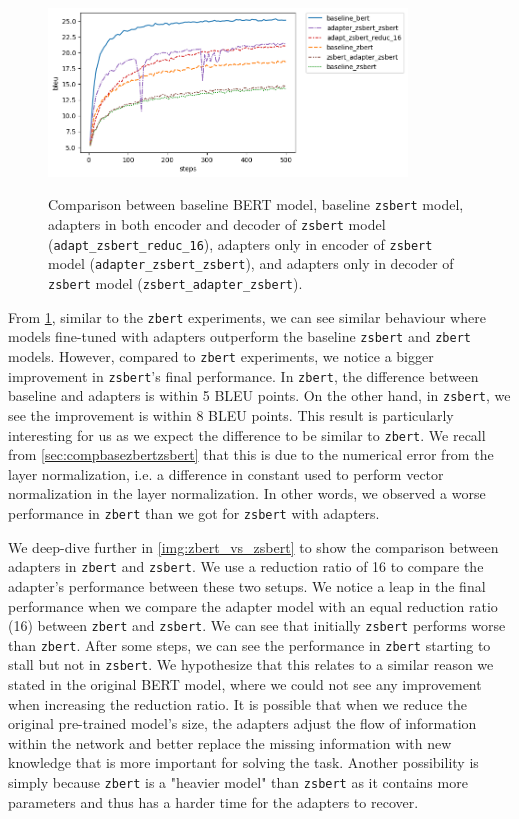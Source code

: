 \begin{figure}[h]
    {\includegraphics[width=0.85\textwidth]{img/zsbert_pos.png}}
    \centering
    \caption[Comparison between baseline BERT and \texttt{zsbert} models.]{Comparison between baseline BERT model, baseline \texttt{zsbert} model, adapters in both encoder and decoder of \texttt{zsbert} model (\texttt{adapt\_zsbert\_reduc\_16}), adapters only in encoder of \texttt{zsbert} model (\texttt{adapter\_zsbert\_zsbert}), and adapters only in decoder of \texttt{zsbert} model (\texttt{zsbert\_adapter\_zsbert}).}
    \label{img:zsbert_pos}
\end{figure}

From \cref{img:zsbert_pos}, similar to the \texttt{zbert} experiments, we can see similar behaviour where models fine-tuned with adapters outperform the baseline \texttt{zsbert} and \texttt{zbert} models. However, compared to \texttt{zbert} experiments, we notice a bigger improvement in \texttt{zsbert}'s final performance. In \texttt{zbert}, the difference between baseline and adapters is within 5 BLEU points. On the other hand, in \texttt{zsbert}, we see the improvement is within 8 BLEU points. This result is particularly interesting for us as we expect the difference to be similar to \texttt{zbert}. We recall from \ref{sec:compbasezbertzsbert} that this is due to the numerical error from the layer normalization, i.e. a difference in constant used to perform vector normalization in the layer normalization. In other words, we observed a worse performance in \texttt{zbert} than we got for \texttt{zsbert} with adapters.

We deep-dive further in \cref{img:zbert_vs_zsbert} to show the comparison between adapters in \texttt{zbert} and \texttt{zsbert}. We use a reduction ratio of 16 to compare the adapter's performance between these two setups. We notice a leap in the final performance when we compare the adapter model with an equal reduction ratio (16) between \texttt{zbert} and \texttt{zsbert}. We can see that initially \texttt{zsbert} performs worse than \texttt{zbert}. After some steps, we can see the performance in \texttt{zbert} starting to stall but not in \texttt{zsbert}. We hypothesize that this relates to a similar reason we stated in the original BERT model, where we could not see any improvement when increasing the reduction ratio. It is possible that when we reduce the original pre-trained model's size, the adapters adjust the flow of information within the network and better replace the missing information with new knowledge that is more important for solving the task. Another possibility is simply because \texttt{zbert} is a "heavier model" than \texttt{zsbert} as it contains more parameters and thus has a harder time for the adapters to recover.

